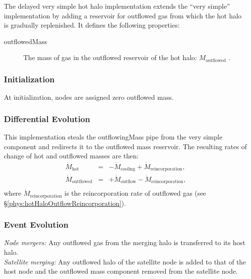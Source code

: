 The delayed very simple hot halo implementation extends the ``very simple'' implementation by adding a reservoir for outflowed gas from which the hot halo is gradually replenished. It defines the following properties:
\begin{description}
 \item [{\normalfont \ttfamily outflowedMass}] The mass of gas in the outflowed reservoir of the hot halo: $M_\mathrm{outflowed}$ {\normalfont \ttfamily [hotHaloOutflowedMass]}.
\end{description}

\subsubsection{Initialization}

At initialization, nodes are assigned zero outflowed mass.

\subsubsection{Differential Evolution}

This implementation steals the {\normalfont \ttfamily outflowingMass} pipe from the very simple component and redirects it to the outflowed mass reservoir. The resulting rates of change of hot and outflowed masses are then:
\begin{eqnarray}
 \dot{M}_\mathrm{hot}      &=& - \dot{M}_\mathrm{cooling} + \dot{M}_\mathrm{reincorporation}, \nonumber \\
 \dot{M}_\mathrm{outflowed} &=& + \dot{M}_\mathrm{outflow} - \dot{M}_\mathrm{reincorporation}, \nonumber \\
\end{eqnarray}
where $\dot{M}_\mathrm{reincorporation}$ is the reincorporation rate of outflowed gas (see \S\ref{phys:hotHaloOutflowReincorporation}).

\subsubsection{Event Evolution}

\noindent\emph{Node mergers:} Any outflowed gas from the merging halo is transferred to its host halo.\\

\noindent\emph{Satellite merging:} Any outflowed halo of the satellite \gls{node} is added to that of the host \gls{node} and the outflowed mass \gls{component} removed from the satellite node.\\

